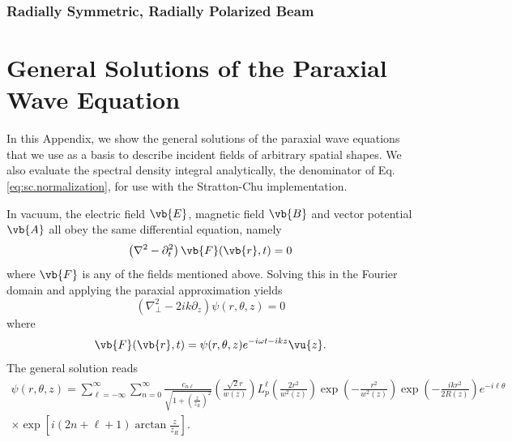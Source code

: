 \documentclass[11pt,SymmetricalJury]{inrsthesis/inrsthesis}
\begin{document}

\subsection{Radially Symmetric, Radially Polarized Beam}

\chapter{General Solutions of the Paraxial Wave Equation}
\label{app:solution-paraxial-equation}

In this Appendix, we show the general solutions of the paraxial wave equations
that we use as a basis to describe incident fields of arbitrary spatial shapes.
We also evaluate the spectral density integral analytically, the denominator
of Eq.\eqref{eq:sc.normalization}, for use with the Stratton-Chu implementation.

In vacuum, the electric field $\vb{E}$, magnetic field $\vb{B}$ and vector
potential $\vb{A}$ all obey the same differential equation, namely
  \begin{equation}
    \left(\nabla^2-\partial_t^2\right)\vb{F}(\vb{r},t) = 0
  \end{equation}
where $\vb{F}$ is any of the fields mentioned above. Solving this
in the Fourier domain and applying the paraxial approximation
yields
  \begin{equation}
    \left(\nabla_\perp^2-2ik\partial_z\right)\psi(r,\theta,z) = 0
  \end{equation}
where
  \begin{equation}
    \vb{F}(\vb{r},t) = \psi(r,\theta,z)e^{-i\omega t - ikz} \vu{z}.
  \end{equation}
The general solution reads \cite{Allen1992}
  \begin{multline}
    \psi(r,\theta,z) = \sum_{\ell=-\infty}^\infty\sum_{n=0}^\infty
      \frac{c_{n\ell}}{\sqrt{1+\left(\frac{z}{z_R}\right)^2}}
      \left(\frac{\sqrt{2}r}{w(z)}\right)
      L_p^\ell\left(\frac{2r^2}{w^2(z)}\right)\exp\left(-\frac{r^2}{w^2(z)}\right)
      \exp\left(-\frac{ikr^2}{2R(z)}\right)e^{-i\ell\theta}\\
      \times\exp\left[i\left(2n+\ell+1\right)\arctan\frac{z}{z_R}\right].
  \end{multline}
\end{document}
